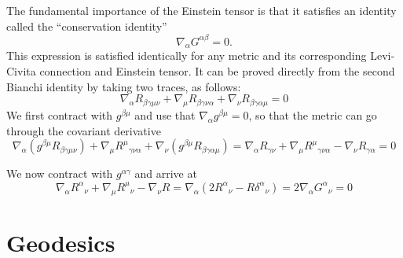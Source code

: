 \begin{points}
\item The fundamental importance of the Einstein tensor is that it satisfies an identity called the ``conservation identity''
\[
  \nabla_\alpha G^{\alpha\beta}=0 .
\]
This expression is satisfied identically for any metric and its corresponding Levi-Civita connection and Einstein tensor. It can be proved directly from the second Bianchi identity by taking two traces, as follows:
\[
  \nabla_\alpha R_{\beta\gamma\mu\nu}+\nabla_\mu R_{\beta\gamma\nu\alpha}+\nabla_\nu R_{\beta\gamma\alpha\mu}=0
\]
We first contract with $g^{\beta\mu}$ and use that $\nabla_\alpha g^{\beta\mu}=0$, so that the metric can go through the covariant derivative
\[
  \nabla_\alpha(g^{\beta\mu}R_{\beta\gamma\mu\nu})+\nabla_\mu R^\mu{}_{\gamma\nu\alpha}+\nabla_\nu(g^{\beta\mu}R_{\beta\gamma\alpha\mu})=\nabla_\alpha R_{\gamma\nu}+\nabla_\mu R^\mu{}_{\gamma\nu\alpha}-\nabla_\nu R_{\gamma\alpha}=0
\]

\item We now contract with $g^{\alpha\gamma}$ and arrive at
\[
  \nabla_\alpha R^\alpha{}_\nu+\nabla_\mu R^\mu{}_\nu-\nabla_\nu R=\nabla_\alpha\left(2R^\alpha{}_\nu-R\delta^\alpha{}_\nu\right)=2\nabla_\alpha G^\alpha{}_\nu=0
\]
\end{points}

\section{Geodesics}

